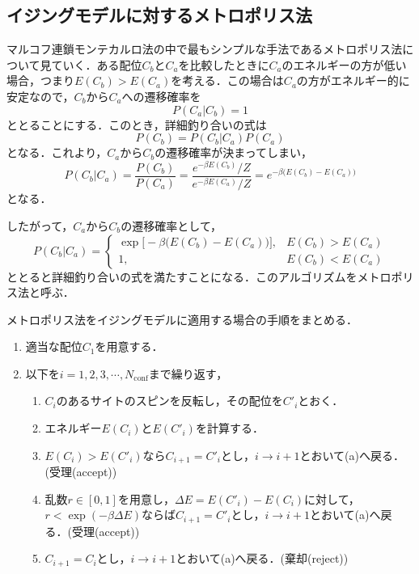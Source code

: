 \documentclass[a4paper,11pt]{jsarticle}
\begin{document}
\subsection*{イジングモデルに対するメトロポリス法}
マルコフ連鎖モンテカルロ法の中で最もシンプルな手法であるメトロポリス法について見ていく．ある配位$C_b$と$C_a$を比較したときに$C_a$のエネルギーの方が低い場合，つまり$E(C_b)>E(C_a)$を考える．この場合は$C_a$の方がエネルギー的に安定なので，$C_b$から$C_a$への遷移確率を
\begin{equation}
  P(C_a|C_b) = 1
\end{equation}
ととることにする．このとき，詳細釣り合いの式は
\begin{equation}
  P(C_b) = P(C_b|C_a)P(C_a)
\end{equation}
となる．これより，$C_a$から$C_b$の遷移確率が決まってしまい，
\begin{equation}
  P(C_b|C_a) = \frac{P(C_b)}{P(C_a)} = \frac{e^{-\beta E(C_b)}/Z}{e^{-\beta E(C_a)}/Z} = e^{ -\beta\Big( E(C_b)-E(C_a) \Big)}
\end{equation}
となる．\par
したがって，$C_a$から$C_b$の遷移確率として，
\begin{equation}
  P(C_b|C_a)=
  \begin{cases}
    \exp\Big[ -\beta\Big( E(C_b)-E(C_a) \Big) \Big], & E(C_b)>E(C_a) \\
    1,                                               & E(C_b)<E(C_a)
  \end{cases}
\end{equation}
ととると詳細釣り合いの式を満たすことになる．このアルゴリズムをメトロポリス法と呼ぶ．\par
メトロポリス法をイジングモデルに適用する場合の手順をまとめる．
\begin{enumerate}
  \item 適当な配位$C_1$を用意する．
  \item 以下を$i = 1,2,3,\cdots,N_{\text{conf}}$まで繰り返す，
        \begin{enumerate}
          \item $C_i$のあるサイトのスピンを反転し，その配位を$C'_i$とおく．
          \item エネルギー$E(C_i)$と$E(C'_i)$を計算する．
          \item $E(C_i)>E(C'_i)$なら$C_{i+1}=C'_i$とし，$i \rightarrow i+1$とおいて(a)へ戻る．(受理(accept))
          \item 乱数$r \in [0,1]$を用意し，$\Delta E = E(C'_i)-E(C_i)$に対して，$r < \exp(-\beta\Delta E)$ならば$C_{i+1}=C'_i$とし，$i \rightarrow i+1$とおいて(a)へ戻る．(受理(accept))
          \item $C_{i+1}=C_i$とし，$i \rightarrow i+1$とおいて(a)へ戻る．(棄却(reject))
        \end{enumerate}
\end{enumerate}
\end{document}
